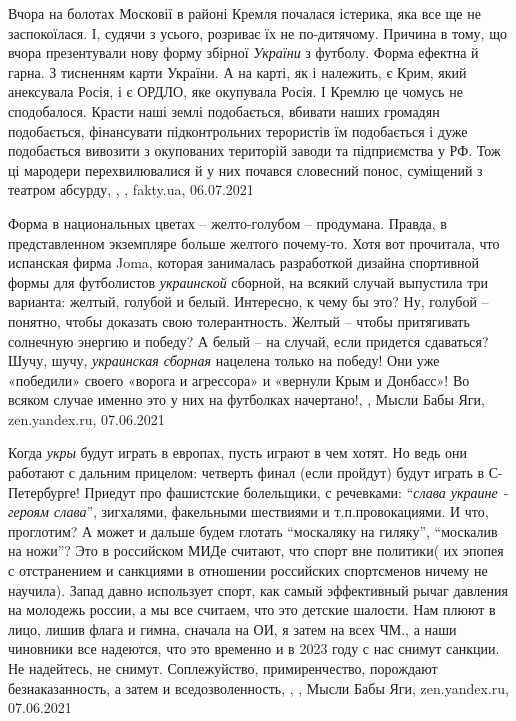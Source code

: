 Вчора на болотах Московії в районі Кремля почалася істерика, яка все ще не
заспокоїлася. І, судячи з усього, розриває їх не по-дитячому. Причина в тому,
що вчора презентували нову форму збірної \emph{України} з футболу. Форма ефектна й
гарна. З тисненням карти України. А на карті, як і належить, є Крим, який
анексувала Росія, і є ОРДЛО, яке окупувала Росія. І Кремлю це чомусь не
сподобалося. Красти наші землі подобається, вбивати наших громадян подобається,
фінансувати підконтрольних терористів їм подобається і дуже подобається
вивозити з окупованих територій заводи та підприємства у РФ. Тож ці мародери
перехвилювалися й у них почався словесний понос, суміщений з театром абсурду,
, , fakty.ua, 06.07.2021

Форма в национальных цветах – желто-голубом – продумана. Правда, в
представленном экземпляре больше желтого почему-то. Хотя вот прочитала, что
испанская фирма Joma, которая занималась разработкой дизайна спортивной формы
для футболистов \emph{украинской} сборной, на всякий случай выпустила три
варианта: желтый, голубой и белый. Интересно, к чему бы это? Ну, голубой –
понятно, чтобы доказать свою толерантность. Желтый – чтобы притягивать
солнечную энергию и победу? А белый – на случай, если придется сдаваться? Шучу,
шучу, \emph{украинская сборная} нацелена только на победу! Они уже «победили»
своего «ворога и агрессора» и «вернули Крым и Донбасс»! Во всяком случае именно
это у них на футболках начертано!,
, Мысли Бабы Яги, zen.yandex.ru, 07.06.2021

Когда \emph{укры} будут играть в европах, пусть играют в чем хотят. Но ведь они
работают с дальним прицелом: четверть финал (если пройдут) будут играть в
С-Петербурге! Приедут про фашистские болельщики, с речевками:
\enquote{\emph{слава украине - героям слава}}, зигхалями, факельными шествиями
и т.п.провокациями. И что, проглотим? А может и дальше будем глотать
\enquote{москаляку на гиляку}, \enquote{москалив на ножи}? Это в российском
МИДе считают, что спорт вне политики( их эпопея с отстранением и санкциями в
отношении российских спортсменов ничему не научила). Запад давно использует
спорт, как самый эффективный рычаг давления на молодежь россии, а мы все
считаем, что это детские шалости. Нам плюют в лицо, лишив флага и гимна,
сначала на ОИ, я затем на всех ЧМ., а наши чиновники все надеются, что это
временно и в 2023 году с нас снимут санкции. Не надейтесь, не снимут.
Соплежуйство, примиренчество, порождают безнаказанность, а затем и
вседозволенность,
,
, Мысли Бабы Яги, zen.yandex.ru, 07.06.2021

